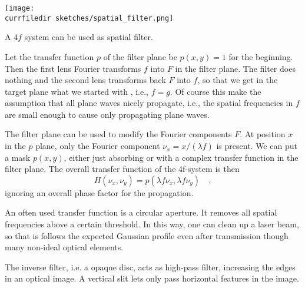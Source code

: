 \begin{marginfigure}
    \texttt{[image: \\currfiledir sketches/spatial\_filter.png]}
    \caption{A $4f$ system can be used as spatial filter.}
\end{marginfigure}

Let the transfer function $p$ of the filter plane be $p(x,y)=1$ for the beginning. Then the first lens Fourier transforms $f$ into $F$ in the filter plane. The filter does nothing and the second lens transforms back $F$ into $f$, so that we get in the target plane what we started with , i.e., $f=g$. Of course this make the assumption that all plane waves nicely propagate, i.e., the spatial frequencies in $f$ are small enough to cause only propagating plane waves.

The filter plane can be used to modify the Fourier components $F$. At position $x$ in the $p$ plane, only the Fourier component $\nu_x = x / (\lambda f)$ is present. We can put a mask $p(x,y)$, either just absorbing or with a complex transfer function in the filter plane. The overall transfer function of the 4f-system is then
\begin{equation}
    H(\nu_x, \nu_y) = p (\lambda f \nu_x, \lambda f \nu_y) \quad , 
\end{equation}
ignoring an overall phase factor for the propagation. 

An often used transfer function is a circular aperture. It removes all spatial frequencies above a certain threshold. In this way, one can clean up a laser beam, so that is follows the expected Gaussian profile even after transmission though many non-ideal optical elements.

The inverse filter, i.e. a opaque disc, acts as high-pass filter, increasing the edges in an optical image. A vertical slit lets only pass horizontal features in the image.



\printbibliography[segment=\therefsegment,heading=subbibliography]
